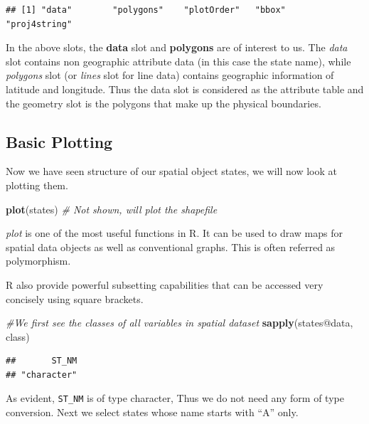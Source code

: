 \documentclass[]{article}
\newenvironment{Shaded}{}{}
\newcommand{\CommentTok}[1]{\textcolor[rgb]{0.38,0.63,0.69}{\textit{#1}}}
\newcommand{\KeywordTok}[1]{\textcolor[rgb]{0.00,0.44,0.13}{\textbf{#1}}}
\newcommand{\NormalTok}[1]{#1}
\newcommand{\OperatorTok}[1]{\textcolor[rgb]{0.40,0.40,0.40}{#1}}
\begin{document}
\begin{verbatim}
## [1] "data"        "polygons"    "plotOrder"   "bbox"        "proj4string"
\end{verbatim}

In the above slots, the \textbf{data} slot and \textbf{polygons} are of
interest to us. The \emph{data} slot contains non geographic attribute
data (in this case the state name), while \emph{polygons} slot (or
\emph{lines} slot for line data) contains geographic information of
latitude and longitude. Thus the data slot is considered as the
attribute table and the geometry slot is the polygons that make up the
physical boundaries.

\hypertarget{basic-plotting}{%
\subsection{Basic Plotting}\label{basic-plotting}}

Now we have seen structure of our spatial object states, we will now
look at plotting them.

\begin{Shaded}
\begin{Highlighting}[]
\KeywordTok{plot}\NormalTok{(states) }\CommentTok{# Not shown, will plot the shapefile}
\end{Highlighting}
\end{Shaded}

\emph{plot} is one of the most useful functions in R. It can be used to
draw maps for spatial data objects as well as conventional graphs. This
is often referred as polymorphism.

R also provide powerful subsetting capabilities that can be accessed
very concisely using square brackets.

\begin{Shaded}
\begin{Highlighting}[]
\CommentTok{#We first see the classes of all variables in spatial dataset}
\KeywordTok{sapply}\NormalTok{(states}\OperatorTok{@}\NormalTok{data, class)}
\end{Highlighting}
\end{Shaded}

\begin{verbatim}
##       ST_NM 
## "character"
\end{verbatim}

As evident, \texttt{ST\_NM} is of type character, Thus we do not need
any form of type conversion. Next we select states whose name starts
with ``A'' only.
\end{document}
